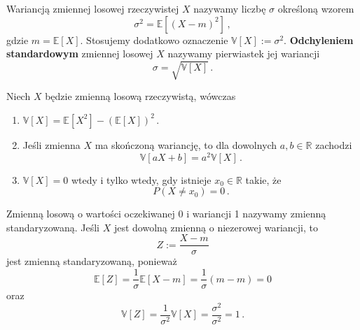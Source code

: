 \documentclass{myclass}
\numberwithin{equation}{section}
\begin{document}
\begin{definition}
Wariancją zmiennej losowej rzeczywistej \(X\) nazywamy liczbę \(\sigma\) określoną wzorem
\begin{equation*}
    \sigma^2 = \mathbb{E}[(X - m)^2]\,,
\end{equation*} 
gdzie \(m = \mathbb{E}[X]\). Stosujemy dodatkowo oznaczenie \(\mathbb{V}[X] := \sigma^2\).
\textbf{Odchyleniem standardowym} zmiennej losowej \(X\) nazywamy pierwiastek jej wariancji
\begin{equation*}
    \sigma = \sqrt{\mathbb{V}[X]}\,.
\end{equation*} 
\end{definition}

\begin{theorem}
Niech \(X\) będzie zmienną losową rzeczywistą, wówczas
\begin{enumerate}
    
    \item \(\mathbb{V}[X] = \mathbb{E}[X^2] - (\mathbb{E}[X])^2\)\,.

    \item Jeśli zmienna \(X\) ma skończoną wariancję, to dla dowolnych \(a,b \in \mathbb{R}\)
    zachodzi
    \begin{equation*}
        \mathbb{V}[aX + b] = a^2 \mathbb{V}[X]\,.
    \end{equation*}

    \item \(\mathbb{V}[X] = 0\) wtedy i tylko wtedy, gdy istnieje \(x_0 \in \mathbb{R}\) takie, że
    \begin{equation*}
        P(X \neq x_0) = 0\,.
    \end{equation*}

\end{enumerate}
\end{theorem}

\begin{definition}
Zmienną losową o wartości oczekiwanej 0 i wariancji 1 nazywamy zmienną standaryzowaną. Jeśli \(X\)
jest dowolną zmienną o niezerowej wariancji, to
\begin{equation*}
    Z := \frac{X - m}{\sigma}
\end{equation*}
jest zmienną standaryzowaną, ponieważ
\begin{equation*}
    \mathbb{E}[Z] = \frac{1}{\sigma}\mathbb{E}[X - m] = \frac{1}{\sigma}(m - m) = 0
\end{equation*}
oraz
\begin{equation*}
    \mathbb{V}[Z] = \frac{1}{\sigma^2} \mathbb{V}[X] = \frac{\sigma^2}{\sigma^2} = 1\,.
\end{equation*}
\end{definition}
\end{document}
